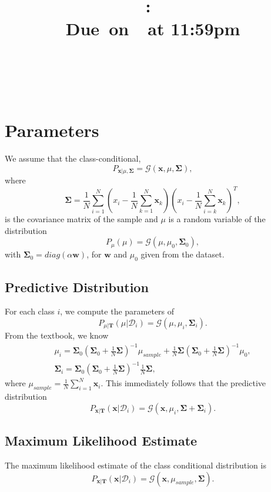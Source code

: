 \documentclass{article}
\title{
    \vspace{2in}
    \textmd{\textbf{\hmwkClass:\ \hmwkTitle}}\\
    \normalsize\vspace{0.1in}\small{Due\ on\ \hmwkDueDate\ at 11:59pm}\\
    \vspace{0.1in}\large{\textit{\hmwkClassInstructor}} \\
    \vspace{3in}
}
\author{
  \hmwkAuthorName \\
  \vspace{0.1in}\small\hmwkPID
}
\date{}
\newcommand*{\G}{\mathcal{G}}
\newcommand*{\D}{\mathcal{D}}
\begin{document}
\maketitle

\pagebreak

\section*{Parameters}

We assume that the class-conditional,
\[
    P_{\mathbf{x}|\mu, \mathbf{\Sigma}} = \G(\mathbf{x}, \mu, \mathbf{\Sigma}),
\]
where
\[
    \mathbf{\Sigma} = \frac{1}{N}\sum_{i = 1}^N \left(x_i - \frac{1}{N}\sum_{k = 1}^N \mathbf{x}_k\right)\left(x_i - \frac{1}{N}\sum_{i = k}^N \mathbf{x}_k\right)^T,
\]
is the covariance matrix of the sample and $\mu$ is a random variable of the distribution
\[
    P_{\mu}(\mu) = \G(\mu, \mu_0, \mathbf{\Sigma}_0),
\]
with $\mathbf{\Sigma}_0 = diag(\alpha\mathbf{w})$, for $\mathbf{w}$ and $\mu_0$ given from the dataset.

\subsection*{Predictive Distribution}

For each class $i$, we compute the parameters of
\[
    P_{\mu|\mathbf{T}}(\mu | \D_i) = \G(\mu, \mu_i, \mathbf{\Sigma}_i).
\]
From the textbook, we know
\begin{gather*}
    \mu_i = \mathbf{\Sigma}_0\left(\mathbf{\Sigma}_0 + \frac{1}{N}\mathbf{\Sigma}\right)^{-1}\mu_{sample} + \frac{1}{N}\mathbf{\Sigma}\left(\mathbf{\Sigma}_0 + \frac{1}{N}\mathbf{\Sigma}\right)^{-1}\mu_0, \\
    \mathbf{\Sigma}_i = \mathbf{\Sigma}_0\left(\mathbf{\Sigma}_0 + \frac{1}{N}\mathbf{\Sigma}\right)^{-1}\frac{1}{N}\mathbf{\Sigma},
\end{gather*}
where $\mu_{sample} = \frac{1}{N}\sum_{i = 1}^N \mathbf{x}_i$. This immediately follows that the predictive distribution
\[
    P_{\mathbf{x}|\mathbf{T}}(\mathbf{x}|\D_i) = \G(\mathbf{x}, \mu_i, \mathbf{\Sigma} + \mathbf{\Sigma}_i).
\]

\subsection*{Maximum Likelihood Estimate}

The maximum likelihood estimate of the class conditional distribution is
\[
    P_{\mathbf{x}|\mathbf{T}}(\mathbf{x}|\D_i) = \G(\mathbf{x}, \mu_{sample}, \mathbf{\Sigma}).
\]
\end{document}
